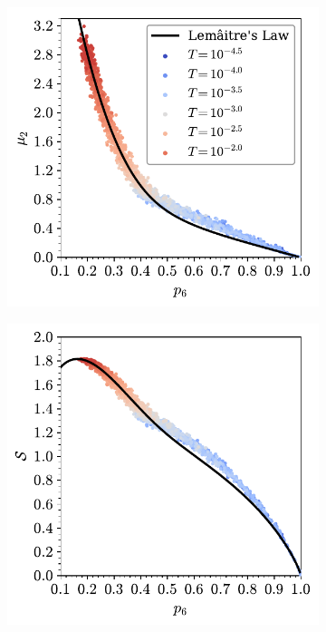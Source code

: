 \begin{figure}[bt]
     \centering
     
     \begin{subfigure}[b]{0.45\textwidth}
         \centering
         \includegraphics[width=\textwidth]{./figures/bilayers/tri_raft_lm_1.pdf}
         \caption{}
         \label{fig:trlm1}
     \end{subfigure}
     \hfill
     \begin{subfigure}[b]{0.45\textwidth}
         \centering
         \includegraphics[width=\textwidth]{./figures/bilayers/tri_raft_lm_3.pdf}
         \caption{}
         \label{fig:trlm2}
     \end{subfigure}
     \hfill
     

\end{figure}
